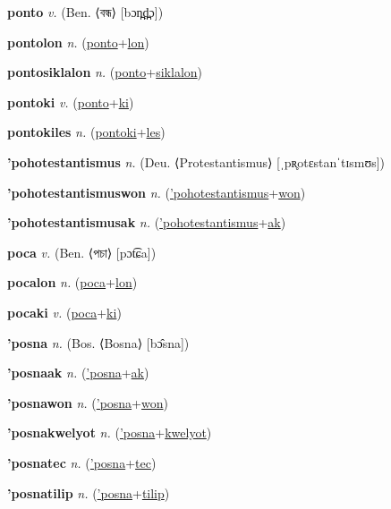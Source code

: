 \textbf{\hypertarget{ponto}{ponto}} \textit{v.} (Ben. ⟨{\bengali{}বন্ধ}⟩ [bɔn̪d̪̤ɔ])


\textbf{\hypertarget{pontolon}{pontolon}} \textit{n.} (\hyperlink{ponto}{ponto}+\allowbreak \hyperlink{lon}{lon})


\textbf{\hypertarget{pontosiklalon}{pontosiklalon}} \textit{n.} (\hyperlink{ponto}{ponto}+\allowbreak \hyperlink{siklalon}{siklalon})


\textbf{\hypertarget{pontoki}{pontoki}} \textit{v.} (\hyperlink{ponto}{ponto}+\allowbreak \hyperlink{ki}{ki})


\textbf{\hypertarget{pontokiles}{pontokiles}} \textit{n.} (\hyperlink{pontoki}{pontoki}+\allowbreak \hyperlink{les}{les})


\textbf{\hypertarget{'pohotestantismus}{'pohotestantismus}} \textit{n.} (Deu. ⟨Protestantismus⟩ [ˌpʀ̥otɛstanˈtɪsmʊs])


\textbf{\hypertarget{'pohotestantismuswon}{'pohotestantismuswon}} \textit{n.} (\hyperlink{'pohotestantismus}{'pohotestantismus}+\allowbreak \hyperlink{won}{won})


\textbf{\hypertarget{'pohotestantismusak}{'pohotestantismusak}} \textit{n.} (\hyperlink{'pohotestantismus}{'pohotestantismus}+\allowbreak \hyperlink{ak}{ak})


\textbf{\hypertarget{poca}{poca}} \textit{v.} (Ben. ⟨{\bengali{}পচা}⟩ [pɔt͡ɕa])


\textbf{\hypertarget{pocalon}{pocalon}} \textit{n.} (\hyperlink{poca}{poca}+\allowbreak \hyperlink{lon}{lon})


\textbf{\hypertarget{pocaki}{pocaki}} \textit{v.} (\hyperlink{poca}{poca}+\allowbreak \hyperlink{ki}{ki})


\textbf{\hypertarget{'posna}{'posna}} \textit{n.} (Bos. ⟨Bosna⟩ [bɔ̂sna])


\textbf{\hypertarget{'posnaak}{'posnaak}} \textit{n.} (\hyperlink{'posna}{'posna}+\allowbreak \hyperlink{ak}{ak})


\textbf{\hypertarget{'posnawon}{'posnawon}} \textit{n.} (\hyperlink{'posna}{'posna}+\allowbreak \hyperlink{won}{won})


\textbf{\hypertarget{'posnakwelyot}{'posnakwelyot}} \textit{n.} (\hyperlink{'posna}{'posna}+\allowbreak \hyperlink{kwelyot}{kwelyot})


\textbf{\hypertarget{'posnatec}{'posnatec}} \textit{n.} (\hyperlink{'posna}{'posna}+\allowbreak \hyperlink{tec}{tec})


\textbf{\hypertarget{'posnatilip}{'posnatilip}} \textit{n.} (\hyperlink{'posna}{'posna}+\allowbreak \hyperlink{tilip}{tilip})



